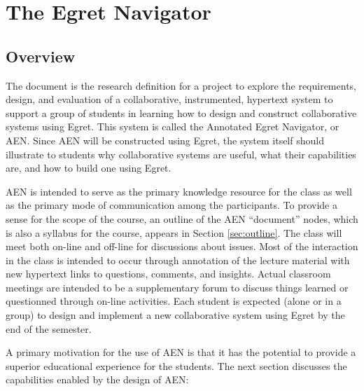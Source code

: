 

\chapter{The Egret Navigator}

\section{Overview}

The document is the research definition for a project to explore the
requirements, design, and evaluation of a 
collaborative, instrumented, hypertext system to support a group of
students in learning how to design and construct collaborative systems
using Egret.  This system is called the Annotated Egret Navigator, or AEN.
Since AEN will be constructed using Egret, the system itself should
illustrate to students why collaborative systems are useful, what their
capabilities are, and how to build one using Egret.

AEN is intended to serve as the primary knowledge resource for the
class as well as the primary mode of communication among the
participants.  To provide a sense for the scope of the course, an
outline of the AEN ``document'' nodes, which is also a syllabus for
the course, appears in Section \ref{sec:outline}.  The class will meet
both on-line and off-line for discussions about issues.  Most of the
interaction in the class is intended to occur through annotation of
the lecture material with new hypertext links to questions, comments,
and insights. Actual classroom meetings are intended to be a
supplementary forum to discuss things learned or questionned through
on-line activities.  Each student is expected (alone or in a group) to
design and implement a new collaborative system using Egret by the end
of the semester.

A primary motivation for the use of AEN is that it has the potential
to provide a superior educational experience for the students. The
next section discusses the capabilities enabled by the design of AEN:

